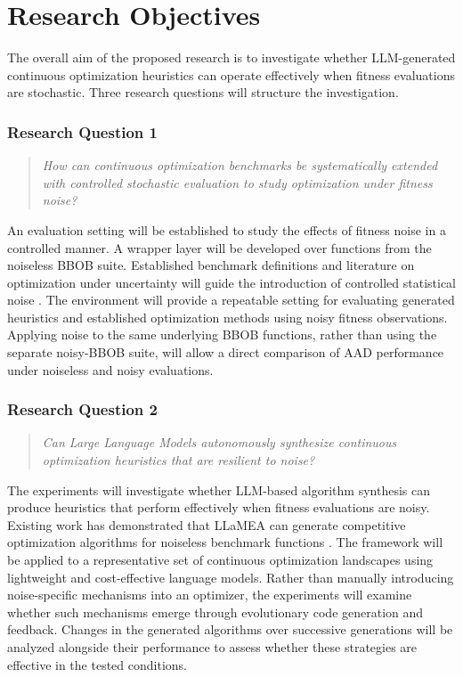 \chapter{Research Objectives}
\label{chap:objectives}

The overall aim of the proposed research is to investigate whether
LLM-generated continuous optimization heuristics can operate effectively
when fitness evaluations are stochastic. Three research questions will
structure the investigation.

\subsection*{Research Question 1}

\begin{quote}
\textit{How can continuous optimization benchmarks be systematically
extended with controlled stochastic evaluation to study optimization
under fitness noise?}
\end{quote}

An evaluation setting will be established to study the effects of
fitness noise in a controlled manner. A wrapper layer will be developed
over functions from the noiseless BBOB suite. Established benchmark
definitions and literature on optimization under uncertainty will guide
the introduction of controlled statistical noise
\cite{Hansen2009Noiseless,Hansen2009Noisy,Jin2005}.
The environment will provide a repeatable setting for evaluating
generated heuristics and established optimization methods using noisy
fitness observations. Applying noise to the same underlying BBOB
functions, rather than using the separate noisy-BBOB suite, will allow
a direct comparison of AAD performance under noiseless and noisy
evaluations.

\subsection*{Research Question 2}

\begin{quote}
\textit{Can Large Language Models autonomously synthesize continuous
optimization heuristics that are resilient to noise?}
\end{quote}

The experiments will investigate whether LLM-based algorithm synthesis
can produce heuristics that perform effectively when fitness evaluations
are noisy. Existing work has demonstrated that LLaMEA can
generate competitive optimization algorithms for noiseless benchmark
functions \cite{LLaMEA2024}. The framework will be applied to a
representative set of continuous optimization landscapes using
lightweight and cost-effective language models. Rather than manually
introducing noise-specific mechanisms into an optimizer, the experiments
will examine whether such mechanisms emerge through evolutionary
code generation and feedback. Changes in the generated algorithms
over successive generations will be analyzed alongside their performance
to assess whether these strategies are effective in the tested conditions.

